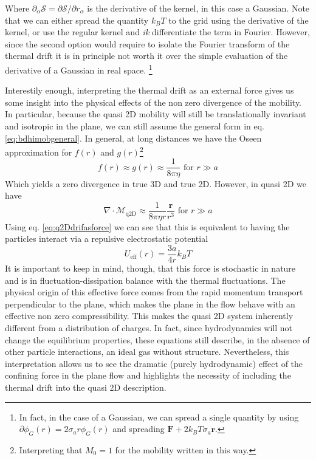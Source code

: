 \documentclass[ twoside,openright,titlepage,numbers=noenddot,%
headinclude,footinclude,cleardoublepage=empty,abstract=on,
BCOR=5mm,paper=a4,fontsize=11pt, dvipsnames
]{scrreprt}
\renewcommand{\vec}[1]{\bm{#1}}
\newcommand{\tens}[1]{\bm{\mathcal{#1}}}
\newcommand{\oper}[1]{\mathcal{#1}}
\newcommand{\kT}{k_B T}
\begin{document}
Where $\partial_\alpha\oper{S} = \partial\oper{S}/\partial r_\alpha$ is the derivative of the kernel, in this case a Gaussian. Note that we can either spread the quantity $\kT$ to the grid using the derivative of the kernel, or use the regular kernel and \emph{ik} differentiate the term in Fourier. However, since the second option would require to isolate the Fourier transform of the thermal drift it is in principle not worth it over the simple evaluation of the derivative of a Gaussian in real space.
\footnote{In fact, in the case of a Gaussian, we can spread a single quantity by using $\partial\phi_G(r) = 2\sigma_ar\phi_G(r)$ and spreading $\vec{F} + 2\kT\sigma_a\vec{r}$.}

Interestily enough, interpreting the thermal drift as an external force gives us some insight into the physical effects of the non zero divergence of the mobility. In particular, because the quasi 2D mobility will still be translationally invariant and isotropic in the plane, we can still assume the general form in eq. \eqref{eq:bdhimobgeneral}. In general, at long distances we have the Oseen approximation for $f(r)$ and $g(r)$\footnote{Interpreting that $M_0=1$ for the mobility written in this way.}
\begin{equation}
  f(r) \approx g(r) \approx \frac{1}{8\pi\eta} \text{ for } r\gg a
\end{equation}
Which yields a zero divergence in true 3D and true 2D. However, in quasi 2D we have
\begin{equation}
  \nabla\cdot\tens{M}_{\text{q2D}} \approx \frac{1}{8\pi\eta r}\frac{\vec{r}}{r^3} \text{ for } r\gg a
\end{equation}
Using eq. \eqref{eq:q2Ddrifasforce} we can see that this is equivalent to having the particles interact via a repulsive electrostatic potential
\begin{equation}
  \label{eq:q2Deffrepulsion}
  U_{\text{eff}}(r) = \frac{3a}{4r}\kT
\end{equation}
It is important to keep in mind, though, that this force is stochastic in nature and is in fluctuation-dissipation balance with the thermal fluctuations. The physical origin of this effective force comes from the rapid momentum transport perpendicular to the plane, which makes the plane in the flow behave with an effective non zero compressibility. This makes the quasi 2D system inherently different from a distribution of charges. In fact, since hydrodynamics will not change the equilibrium properties, these equations still describe, in the absence of other particle interactions, an ideal gas without structure. Nevertheless, this interpretation allows us to see the dramatic (purely hydrodynamic) effect of the confining force in the plane flow and highlights the necessity of including the thermal drift into the quasi 2D description.
\end{document}
